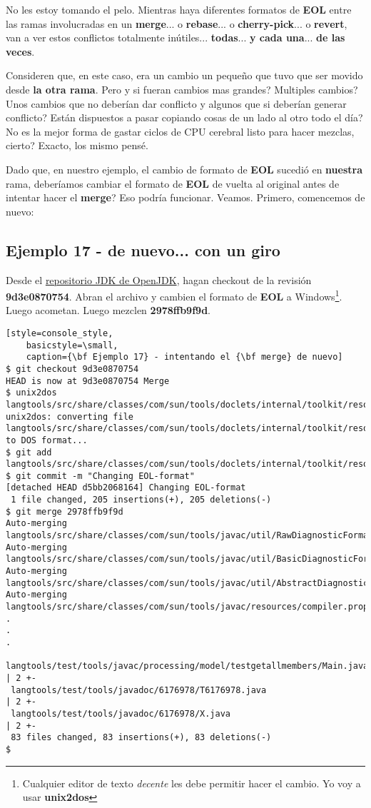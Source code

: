 No les estoy tomando el pelo. Mientras haya diferentes formatos de {\bf EOL} entre las ramas involucradas en un {\bf merge}... o {\bf rebase}...
o {\bf cherry-pick}... o {\bf revert}, van a ver estos conflictos totalmente inútiles... {\bf todas}... {\bf y cada una}... {\bf de las veces}.

Consideren que, en este caso, era un cambio un pequeño que tuvo que ser movido desde {\bf la otra rama}. Pero y si fueran cambios
mas grandes? Multiples cambios? Unos cambios que no deberían dar conflicto y algunos que si deberían generar conflicto? Están
dispuestos a pasar copiando cosas de un lado al otro todo el día? No es la mejor forma de gastar ciclos de CPU cerebral listo para
hacer mezclas, cierto? Exacto, los mismo pensé.

Dado que, en nuestro ejemplo, el cambio de formato de {\bf EOL} sucedió en {\bf nuestra} rama, deberíamos cambiar el formato de {\bf EOL}
de vuelta al original antes de intentar hacer el {\bf merge}? Eso podría funcionar. Veamos. Primero, comencemos de nuevo:

\subsection{Ejemplo 17 - de nuevo... con un giro}

Desde el \hyperref[openjdk_repo]{repositorio JDK de OpenJDK}, hagan checkout de la revisión {\bf 9d3e0870754}. Abran el archivo
y cambien el formato de {\bf EOL} a Windows\footnote{Cualquier editor de texto {\it decente} les debe permitir hacer el cambio. Yo
voy a usar {\bf unix2dos}}. Luego acometan. Luego mezclen {\bf 2978ffb9f9d}.

\begin{lstlisting}[style=console_style,
	basicstyle=\small,
	caption={\bf Ejemplo 17} - intentando el {\bf merge} de nuevo]
$ git checkout 9d3e0870754
HEAD is now at 9d3e0870754 Merge
$ unix2dos langtools/src/share/classes/com/sun/tools/doclets/internal/toolkit/resources/doclet.xml
unix2dos: converting file langtools/src/share/classes/com/sun/tools/doclets/internal/toolkit/resources/doclet.xml to DOS format...
$ git add langtools/src/share/classes/com/sun/tools/doclets/internal/toolkit/resources/doclet.xml
$ git commit -m "Changing EOL-format"
[detached HEAD d5bb2068164] Changing EOL-format
 1 file changed, 205 insertions(+), 205 deletions(-)
$ git merge 2978ffb9f9d
Auto-merging langtools/src/share/classes/com/sun/tools/javac/util/RawDiagnosticFormatter.java
Auto-merging langtools/src/share/classes/com/sun/tools/javac/util/BasicDiagnosticFormatter.java
Auto-merging langtools/src/share/classes/com/sun/tools/javac/util/AbstractDiagnosticFormatter.java
Auto-merging langtools/src/share/classes/com/sun/tools/javac/resources/compiler.properties
.
.
.
 langtools/test/tools/javac/processing/model/testgetallmembers/Main.java                                | 2 +-
 langtools/test/tools/javadoc/6176978/T6176978.java                                                     | 2 +-
 langtools/test/tools/javadoc/6176978/X.java                                                            | 2 +-
 83 files changed, 83 insertions(+), 83 deletions(-)
$
\end{lstlisting}

